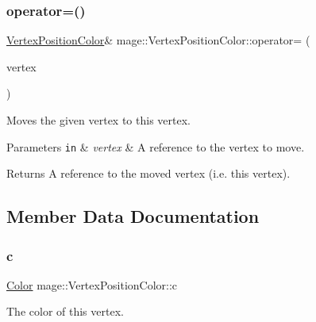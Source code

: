 \subsubsection{\texorpdfstring{operator=()}{operator=()}\hspace{0.1cm}{\footnotesize\ttfamily [2/2]}}
{\footnotesize\ttfamily \hyperlink{structmage_1_1_vertex_position_color}{Vertex\+Position\+Color}\& mage\+::\+Vertex\+Position\+Color\+::operator= (\begin{DoxyParamCaption}\item[{\hyperlink{structmage_1_1_vertex_position_color}{Vertex\+Position\+Color} \&\&}]{vertex }\end{DoxyParamCaption})\hspace{0.3cm}{\ttfamily [default]}}

Moves the given vertex to this vertex.


\begin{DoxyParams}[1]{Parameters}
\mbox{\tt in}  & {\em vertex} & A reference to the vertex to move. \\
\hline
\end{DoxyParams}
\begin{DoxyReturn}{Returns}
A reference to the moved vertex (i.\+e. this vertex). 
\end{DoxyReturn}


\subsection{Member Data Documentation}
\hypertarget{structmage_1_1_vertex_position_color_a4a9e50e66f73e93a9a529c0c940e2458}{}\label{structmage_1_1_vertex_position_color_a4a9e50e66f73e93a9a529c0c940e2458} 
\subsubsection{\texorpdfstring{c}{c}}
{\footnotesize\ttfamily \hyperlink{structmage_1_1_color}{Color} mage\+::\+Vertex\+Position\+Color\+::c}

The color of this vertex. \hypertarget{structmage_1_1_vertex_position_color_afe40a78afb8e13e742d93d5092b1a614}{}\label{structmage_1_1_vertex_position_color_afe40a78afb8e13e742d93d5092b1a614} 
